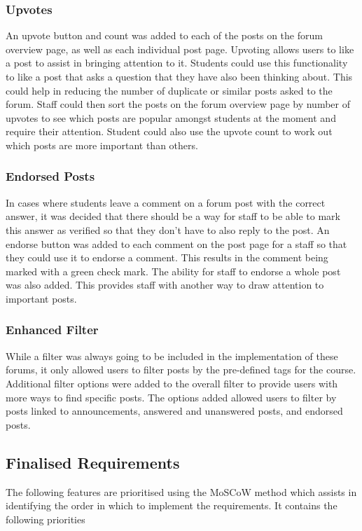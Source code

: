 \subsubsection{Upvotes}
An upvote button and count was added to each of the posts on the forum overview page, as well as each individual post page.
Upvoting allows users to like a post to assist in bringing attention to it.
Students could use this functionality to like a post that asks a question that they have also been thinking about.
This could help in reducing the number of duplicate or similar posts asked to the forum.
Staff could then sort the posts on the forum overview page by number of upvotes to see which posts are popular amongst students at the moment and require their attention.
Student could also use the upvote count to work out which posts are more important than others.

\subsubsection{Endorsed Posts}
In cases where students leave a comment on a forum post with the correct answer, it was decided that there should be a way for staff to be able to mark this answer as verified so that they don't have to also reply to the post.
An endorse button was added to each comment on the post page for a staff so that they could use it to endorse a comment.
This results in the comment being marked with a green check mark.
The ability for staff to endorse a whole post was also added.
This provides staff with another way to draw attention to important posts.

\subsubsection{Enhanced Filter}
While a filter was always going to be included in the implementation of these forums, it only allowed users to filter posts by the pre-defined tags for the course.
Additional filter options were added to the overall filter to provide users with more ways to find specific posts.
The options added allowed users to filter by posts linked to announcements, answered and unanswered posts, and endorsed posts.

\subsection{Finalised Requirements}
The following features are prioritised using the MoSCoW method which assists in identifying the order in which to implement the requirements. \cite{moscow}
It contains the following priorities

